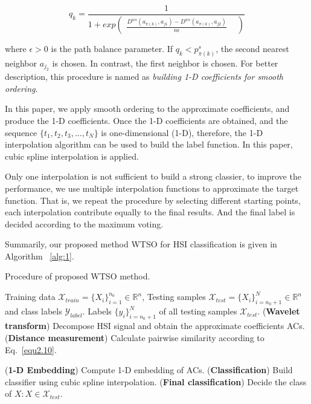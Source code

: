 \documentclass{ws-ijwmip}
\begin{document}
\begin{equation}
q_k = \frac{1}{1+exp\begin{pmatrix}
\frac{D^{ws}(a_{\pi(k)},a_{j1})-D^{ws}(a_{\pi(k)},a_{j2})}{n\epsilon } &
\end{pmatrix}}
\label{equ2.17}
\end{equation}



 \noindent where $\epsilon>0$ is the path balance parameter. If $q_k<p^s_{\pi(k)}$, the second nearest neighbor $a_{j_2}$ is chosen. In contrast, the first neighbor is chosen. 
For better description, this procedure is named as \emph{building 1-D coefficients for smooth ordering}.


In this paper, we apply smooth ordering to the approximate coefficients, and produce the 1-D coefficients. Once the 1-D coefficients are obtained, and the sequence $\{t_1,t_2,t_3,\dots, t_N\}$ is one-dimensional (1-D), therefore, the 1-D interpolation algorithm can be used to build the label function. In this paper, cubic spline interpolation is applied. 

Only one interpolation is not sufficient to build a strong classier, to improve the performance, we use multiple interpolation functions to approximate the target function. That is, we repeat the procedure by selecting different starting points, each interpolation contribute equally to the final results. And the final label is decided according to the maximum voting.

Summarily, our proposed method WTSO for HSI classification is given in Algorithm ~\ref{alg:1}.

\begin{algorithm}
	\renewcommand{\algorithmicrequire}{\textbf{Input:}}
	\renewcommand{\algorithmicensure}{\textbf{Output:}}
	\caption{Procedure of proposed WTSO method.}
	\label{alg:1}
	\begin{algorithmic}[1]
		\REQUIRE Training data $\mathcal{X}_{train}=\{X_i\}_{i=1}^{n_0}\in \mathbb{R}^n$, Testing samples $\mathcal{X}_{test}=\{X_i\}_{i=n_0+1}^N\in \mathbb{R}^n$ and class labels $\mathcal{Y}_{label}$.
		\ENSURE Labels $\{y_i\}_{i=n_0+1}^N$ of all testing samples $\mathcal{X}_{test}$.
		\STATE (\textbf{Wavelet transform}) Decompose HSI signal and obtain the approximate coefficients ACs.
		\STATE (\textbf{Distance measurement}) Calculate pairwise similarity according to Eq.~\ref{equ2.10}.

		\STATE (\textbf{1-D Embedding}) Compute 1-D embedding of ACs.
		\STATE (\textbf{Classification}) Build classifier using cubic spline interpolation.
		\ENDFOR
		\STATE (\textbf{Final classification}) Decide the class of $X:X\in \mathcal{X}_{test}$.
	\end{algorithmic}
\end{algorithm}
\end{document}
